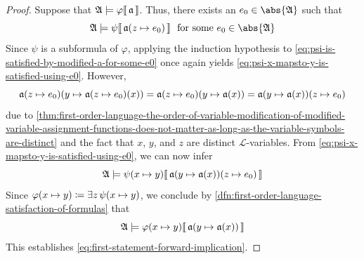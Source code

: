 \begin{proof}
    \vspace{0.3cm}
    \noindent
    Suppose that \(  \mathfrak{A} \models \varphi\llbracket\, \mathfrak{a} \,\rrbracket \). Thus, there exists an \( e_{0} \in \abs{\mathfrak{A}} \) such that
    \begin{equation}
        \label{eq:psi-is-satisfied-by-modified-a-for-some-e0}
        \folwffsatisfaction{\mathfrak{A}}{ \psi }{ \folmodifiedvariableassignmentfunction{\mathfrak{a}}{z}{e_{0}} }
        \ \ \text{for some} \  e_{0} \in \abs{\mathfrak{A}}
    \end{equation}
    Since \( \psi \) is a subformula of \( \varphi \), applying the induction hypothesis to \eqref{eq:psi-is-satisfied-by-modified-a-for-some-e0} once again
    yields \eqref{eq:psi-x-mapsto-y-is-satisfied-using-e0}.
    However,
    \begin{equation*}
        \folmodifiedvariableassignmentfunction{ \folmodifiedvariableassignmentfunction{\mathfrak{a}}{z}{e_{0}} }{y}{ \folmodifiedvariableassignmentfunction{\mathfrak{a}}{z}{e_{0}}(x) } = \folmodifiedvariableassignmentfunction{ \folmodifiedvariableassignmentfunction{\mathfrak{a}}{z}{e_{0}} }{y}{ \mathfrak{a}(x) }
     = \folmodifiedvariableassignmentfunction{ \folmodifiedvariableassignmentfunction{\mathfrak{a}}{y}{\mathfrak{a}(x)} }{z}{e_{0}}
    \end{equation*}
    due to \cref{thm:first-order-language-the-order-of-variable-modification-of-modified-variable-assignment-functions-does-not-matter-as-long-as-the-variable-symbols-are-distinct}
    and the fact that \( x \), \( y \), and \( z \) are distinct \( \mathcal{L} \)-variables.
    From \eqref{eq:psi-x-mapsto-y-is-satisfied-using-e0}, we can now infer
    \begin{equation*}
        \folwffsatisfaction{\mathfrak{A}}{ \folfreevariablereplacement{\psi}{x}{y} }{ \folmodifiedvariableassignmentfunction{ \folmodifiedvariableassignmentfunction{\mathfrak{a}}{y}{\mathfrak{a}(x)} }{z}{e_{0}} }      
    \end{equation*}
    Since \( \folfreevariablereplacement{\varphi}{x}{y} \coloneq \exists z \, \folfreevariablereplacement{\psi}{x}{y} \), we conclude by
    \cref{dfn:first-order-language-satisfaction-of-formulas} that
    \begin{equation*}
        \folwffsatisfaction{\mathfrak{A}}{ \folfreevariablereplacement{\varphi}{x}{y} }{ \folmodifiedvariableassignmentfunction{\mathfrak{a}}{y}{\mathfrak{a}(x)} }
    \end{equation*}
    This establishes \eqref{eq:first-statement-forward-implication}.

\end{proof}
